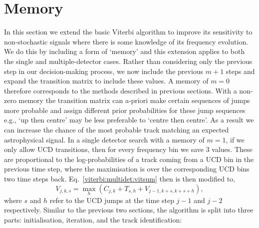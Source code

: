\section{\label{viterbi:memory} Memory}
%
%
In this section we extend the basic Viterbi algorithm to improve its sensitivity to non-stochastic signals where there is some knowledge of its frequency evolution.
We do this by including a form of `memory' and this extension applies to both the single and multiple-detector cases.
Rather than considering only the previous step in our decision-making process, we now include the previous $m+1$ steps and expand the transition matrix to include these values.
A memory of $m=0$ therefore corresponds to the methods described in previous sections.
With a non-zero memory the transition matrix can a-priori make certain sequences of jumps more probable and assign different prior probabilities for these jump sequences e.g., `up then centre' may be less preferable to `centre then centre'.
As a result we can increase the chance of the most probable track matching an expected astrophysical signal.
In a single detector search with a memory of $m=1$, if we only allow \ac{UCD} transitions, then for every frequency bin we save 3 values. These are proportional to the log-probabilities of a track coming from a \ac{UCD} bin in the previous time step, where the maximisation is over the corresponding \ac{UCD} bins two time steps back.
Eq.~\ref{viterbi:multidet:vitsum} then is then modified to,
%
\begin{equation}
\label{viterbi:memory:stat}
V_{j,k,s} = \max_{h} ({C}_{j,k} + T_{s,h} +  V_{j-1,k+s,k+s+h}),
\end{equation}
%
where $s$ and $h$ refer to the \ac{UCD} jumps at the time step $j-1$ and $j-2$ respectively.  Similar to the previous two sections, the algorithm is split into three parts: initialisation, iteration, and the track identification:

